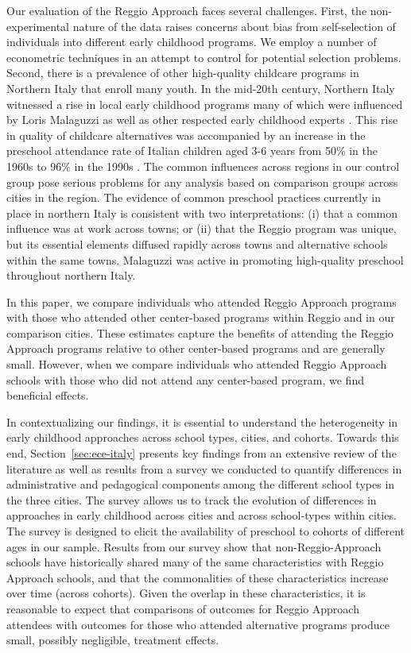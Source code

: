 Our evaluation of the Reggio Approach faces several challenges. First, the non-experimental nature of the data raises concerns about bias from self-selection of individuals into different early childhood programs. We employ a number of econometric techniques in an attempt to control for potential selection problems. Second, there is a prevalence of other high-quality childcare programs in Northern Italy that enroll many youth. In the mid-20th century, Northern Italy witnessed a rise in local early childhood programs many of which were influenced by Loris Malaguzzi as well as other respected early childhood experts \citep{OECD_2001_Italy-Country-Note}. This rise in quality of childcare alternatives was accompanied by an increase in the preschool attendance rate of Italian children aged 3-6 years from 50\% in the 1960s to 96\% in the 1990s \citep{Hohnerlein_2015_Development-and-Diffusion}. The common influences across regions in our control group pose serious problems for any analysis based on comparison groups across cities in the region.  The evidence of common preschool practices currently in place in northern Italy is consistent with two interpretations: (i) that a common influence was at work across towns; or (ii) that the Reggio program was unique, but its essential elements diffused rapidly across towns and alternative schools within the same towns. Malaguzzi was active in promoting high-quality preschool throughout northern Italy. 

In this paper, we compare individuals who attended Reggio Approach programs with those who attended other center-based programs within Reggio and in our comparison cities. These estimates capture the benefits of attending the Reggio Approach programs relative to other center-based programs and are generally small. However, when we compare individuals who attended Reggio Approach schools with those who did not attend any center-based program, we find beneficial effects.

In contextualizing our findings, it is essential to understand the heterogeneity in early childhood approaches across school types, cities, and cohorts. Towards this end, Section~\ref{sec:ece-italy} presents key findings from an extensive review of the literature as well as results from a survey we conducted to quantify differences in administrative and pedagogical components among the different school types in the three cities. The survey allows us to track the evolution of differences in approaches in early childhood across cities and across school-types within cities. The survey is designed to elicit the availability of preschool to cohorts of different ages in our sample. Results from our survey show that non-Reggio-Approach schools have historically shared many of the same characteristics with Reggio Approach schools, and that the commonalities of these characteristics increase over time (across cohorts). Given the overlap in these characteristics, it is reasonable to expect that comparisons of outcomes for Reggio Approach attendees with outcomes for those who attended alternative programs produce small, possibly negligible, treatment effects.

